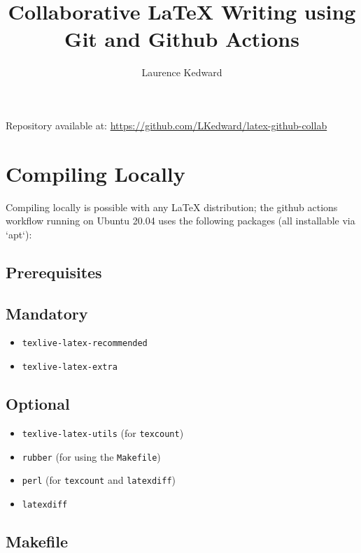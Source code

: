 \documentclass[]{article}
\title{Collaborative LaTeX Writing using Git and Github Actions}
\author{Laurence Kedward}
\begin{document}
\maketitle


Repository available at: \url{https://github.com/LKedward/latex-github-collab}

\section{Compiling Locally}

Compiling locally is possible with any LaTeX distribution; the github actions workflow running on Ubuntu 20.04 uses the following packages (all installable via `apt`):

\subsection{Prerequisites}



\subsection*{Mandatory}
\begin{itemize}
	
	\item \texttt{texlive-latex-recommended}
	\item \texttt{texlive-latex-extra}
	
\end{itemize}

\subsection*{Optional}
\begin{itemize}
	
	\item \texttt{texlive-latex-utils} \quad (for \texttt{texcount})
	\item \texttt{rubber} \quad (for using the \texttt{Makefile})
	\item \texttt{perl} \quad (for \texttt{texcount} and \texttt{latexdiff})
	\item \texttt{latexdiff}
	
\end{itemize}


\subsection{Makefile}
\end{document}
